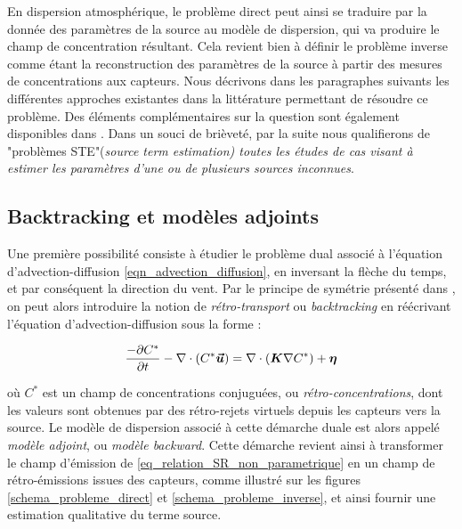 	
	En dispersion atmosphérique, le problème direct peut ainsi se traduire par la donnée des paramètres de la source au modèle de dispersion, qui va produire le champ de concentration résultant. Cela revient bien à définir le problème inverse comme étant la reconstruction des paramètres de la source à partir des mesures de concentrations aux capteurs. Nous décrivons dans les paragraphes suivants les différentes approches existantes dans la littérature permettant de résoudre ce problème. Des éléments complémentaires sur la question sont également disponibles dans \cite{Rao2007}. Dans un souci de brièveté, par la suite nous qualifierons de "problèmes STE"(\textit{source term estimation) toutes les études de cas visant à estimer les paramètres d'une ou de plusieurs sources inconnues}.\\
	
	
 \subsection{Backtracking et modèles adjoints}
 
 Une première possibilité consiste à étudier le problème dual associé à l'équation d'advection-diffusion  \eqref{eqn_advection_diffusion}, en inversant la flèche du temps, et par conséquent la direction du vent.  Par le principe de symétrie présenté dans \cite{Hourdin2006a}, on peut alors introduire la notion de \textit{rétro-transport} ou \textit{backtracking} en  réécrivant l'équation d'advection-diffusion sous la forme : 
 
 \begin{equation}
 \label{eqn_advection_diffusion_backward}
 \dfrac{-\partial C^*}{\partial t} - \nabla \cdot(C^*\bm{\vec{u}}) = \nabla \cdot (\bm{K}\nabla C^*) + {\bm{\eta}}
 \end{equation}
 
 où $C^*$ est un champ de concentrations conjuguées, ou \textit{rétro-concentrations}, dont les valeurs sont obtenues par des rétro-rejets virtuels depuis les capteurs vers la source. Le modèle de dispersion associé à cette démarche duale est alors appelé \textit{modèle adjoint}, ou \textit{modèle backward}. Cette démarche revient ainsi à transformer le champ d'émission de \eqref{eq_relation_SR_non_parametrique} en un champ de rétro-émissions issues des capteurs, comme illustré sur les figures \ref{schema_probleme_direct} et \ref{schema_probleme_inverse}, et ainsi fournir une estimation qualitative du terme source.\\
 
